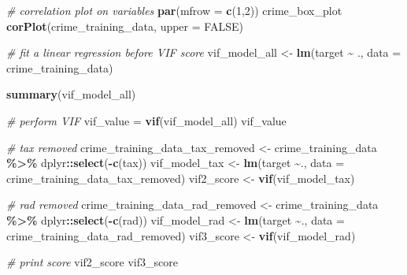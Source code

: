 \documentclass[
]{article}
\newenvironment{Shaded}{\begin{snugshade}}{\end{snugshade}}
\newcommand{\AttributeTok}[1]{\textcolor[rgb]{0.13,0.29,0.53}{#1}}
\newcommand{\CommentTok}[1]{\textcolor[rgb]{0.56,0.35,0.01}{\textit{#1}}}
\newcommand{\ConstantTok}[1]{\textcolor[rgb]{0.56,0.35,0.01}{#1}}
\newcommand{\DecValTok}[1]{\textcolor[rgb]{0.00,0.00,0.81}{#1}}
\newcommand{\FunctionTok}[1]{\textcolor[rgb]{0.13,0.29,0.53}{\textbf{#1}}}
\newcommand{\NormalTok}[1]{#1}
\newcommand{\OtherTok}[1]{\textcolor[rgb]{0.56,0.35,0.01}{#1}}
\newcommand{\SpecialCharTok}[1]{\textcolor[rgb]{0.81,0.36,0.00}{\textbf{#1}}}
\begin{document}
\begin{Shaded}
\begin{Highlighting}[]
\CommentTok{\# correlation plot on variables}
\FunctionTok{par}\NormalTok{(}\AttributeTok{mfrow =} \FunctionTok{c}\NormalTok{(}\DecValTok{1}\NormalTok{,}\DecValTok{2}\NormalTok{))}
\NormalTok{crime\_box\_plot}
\FunctionTok{corPlot}\NormalTok{(crime\_training\_data, }\AttributeTok{upper =} \ConstantTok{FALSE}\NormalTok{)}

\CommentTok{\# fit a linear regression before VIF score}
\NormalTok{vif\_model\_all }\OtherTok{\textless{}{-}} \FunctionTok{lm}\NormalTok{(target }\SpecialCharTok{\textasciitilde{}}\NormalTok{ ., }\AttributeTok{data =}\NormalTok{ crime\_training\_data)}

\FunctionTok{summary}\NormalTok{(vif\_model\_all)}

\CommentTok{\# perform VIF}
\NormalTok{vif\_value }\OtherTok{=} \FunctionTok{vif}\NormalTok{(vif\_model\_all)}
\NormalTok{vif\_value}

\CommentTok{\# tax removed}
\NormalTok{crime\_training\_data\_tax\_removed }\OtherTok{\textless{}{-}}\NormalTok{ crime\_training\_data }\SpecialCharTok{\%\textgreater{}\%}
\NormalTok{  dplyr}\SpecialCharTok{::}\FunctionTok{select}\NormalTok{(}\SpecialCharTok{{-}}\FunctionTok{c}\NormalTok{(tax))}
\NormalTok{vif\_model\_tax }\OtherTok{\textless{}{-}} \FunctionTok{lm}\NormalTok{(target }\SpecialCharTok{\textasciitilde{}}\NormalTok{., }\AttributeTok{data =}\NormalTok{ crime\_training\_data\_tax\_removed)}
\NormalTok{vif2\_score }\OtherTok{\textless{}{-}} \FunctionTok{vif}\NormalTok{(vif\_model\_tax)}

\CommentTok{\# rad removed}
\NormalTok{crime\_training\_data\_rad\_removed }\OtherTok{\textless{}{-}}\NormalTok{ crime\_training\_data }\SpecialCharTok{\%\textgreater{}\%}
\NormalTok{  dplyr}\SpecialCharTok{::}\FunctionTok{select}\NormalTok{(}\SpecialCharTok{{-}}\FunctionTok{c}\NormalTok{(rad))}
\NormalTok{vif\_model\_rad }\OtherTok{\textless{}{-}} \FunctionTok{lm}\NormalTok{(target }\SpecialCharTok{\textasciitilde{}}\NormalTok{., }\AttributeTok{data =}\NormalTok{ crime\_training\_data\_rad\_removed)}
\NormalTok{vif3\_score }\OtherTok{\textless{}{-}} \FunctionTok{vif}\NormalTok{(vif\_model\_rad)}

\CommentTok{\# print score}
\NormalTok{vif2\_score}
\NormalTok{vif3\_score}


\end{Highlighting}
\end{Shaded}
\end{document}
